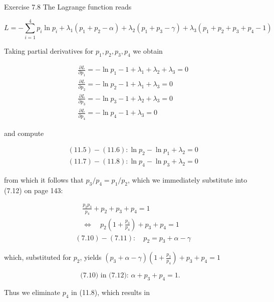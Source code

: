 \documentclass[10pt]{book}
\begin{document}
\begin{center}
\begin{enumerate}
\begin{center}
\begin{center}
\begin{center}
\begin{center}
\begin{center}
Exercise 7.8 The Lagrange function reads


\begin{equation*}
L=-\sum_{i=1}^{4} p_{i} \ln p_{i}+\lambda_{1}\left(p_{1}+p_{2}-\alpha\right)+\lambda_{2}\left(p_{1}+p_{3}-\gamma\right)+\lambda_{3}\left(p_{1}+p_{2}+p_{3}+p_{4}-1\right) \tag{11.4}
\end{equation*}


Taking partial derivatives for $p_{1}, p_{2}, p_{3}, p_{4}$ we obtain


\begin{align*}
& \frac{\partial L}{\partial p_{1}}=-\ln p_{1}-1+\lambda_{1}+\lambda_{2}+\lambda_{3}=0  \tag{11.5}\\
& \frac{\partial L}{\partial p_{2}}=-\ln p_{2}-1+\lambda_{1}+\lambda_{3}=0  \tag{11.6}\\
& \frac{\partial L}{\partial p_{3}}=-\ln p_{3}-1+\lambda_{2}+\lambda_{3}=0  \tag{11.7}\\
& \frac{\partial L}{\partial p_{4}}=-\ln p_{4}-1+\lambda_{3}=0 \tag{11.8}
\end{align*}


and compute


\begin{align*}
& (11.5)-(11.6): \ln p_{2}-\ln p_{1}+\lambda_{2}=0  \tag{11.9}\\
& (11.7)-(11.8): \ln p_{4}-\ln p_{3}+\lambda_{2}=0 \tag{11.10}
\end{align*}


from which it follows that $p_{3} / p_{4}=p_{1} / p_{2}$, which we immediately substitute into (7.12) on page 143:


\begin{align*}
& \quad \frac{p_{2} p_{3}}{p_{4}}+p_{2}+p_{3}+p_{4}=1 \\
& \quad \Leftrightarrow \quad p_{2}\left(1+\frac{p_{3}}{p_{4}}\right)+p_{3}+p_{4}=1  \tag{11.11}\\
& (7.10)-(7.11): \quad p_{2}=p_{3}+\alpha-\gamma
\end{align*}


which, substituted for $p_{2}$, yields $\left(p_{3}+\alpha-\gamma\right)\left(1+\frac{p_{3}}{p_{4}}\right)+p_{3}+p_{4}=1$


\begin{equation*}
\text { (7.10) in (7.12): } \alpha+p_{3}+p_{4}=1 \text {. } \tag{11.12}
\end{equation*}


Thus we eliminate $p_{4}$ in (11.8), which results in



\end{center}
\end{center}
\end{center}
\end{center}
\end{center}
\end{enumerate}
\end{center}
\end{document}
